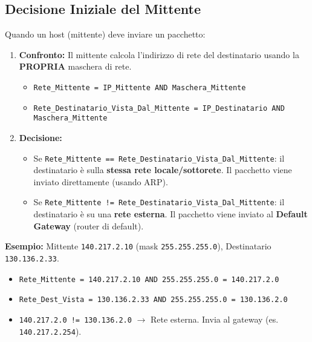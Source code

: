 \documentclass{article}
\begin{document}
\subsection{Decisione Iniziale del Mittente}
Quando un host (mittente) deve inviare un pacchetto:
\begin{enumerate}
    \item \textbf{Confronto:} Il mittente calcola l'indirizzo di rete del destinatario usando la \textbf{PROPRIA} maschera di rete.
    \begin{itemize}
        \item \texttt{Rete\_Mittente = IP\_Mittente AND Maschera\_Mittente}
        \item \texttt{Rete\_Destinatario\_Vista\_Dal\_Mittente = IP\_Destinatario AND Maschera\_Mittente}
    \end{itemize}
    \item \textbf{Decisione:}
    \begin{itemize}
        \item Se \texttt{Rete\_Mittente == Rete\_Destinatario\_Vista\_Dal\_Mittente}: il destinatario è sulla \textbf{stessa rete locale/sottorete}. Il pacchetto viene inviato direttamente (usando ARP).
        \item Se \texttt{Rete\_Mittente != Rete\_Destinatario\_Vista\_Dal\_Mittente}: il destinatario è su una \textbf{rete esterna}. Il pacchetto viene inviato al \textbf{Default Gateway} (router di default).
    \end{itemize}
\end{enumerate}
\textbf{Esempio:} Mittente \texttt{140.217.2.10} (mask \texttt{255.255.255.0}), Destinatario \texttt{130.136.2.33}.
\begin{itemize}
    \item \texttt{Rete\_Mittente = 140.217.2.10 AND 255.255.255.0 = 140.217.2.0}
    \item \texttt{Rete\_Dest\_Vista = 130.136.2.33 AND 255.255.255.0 = 130.136.2.0}
    \item \texttt{140.217.2.0 != 130.136.2.0} $\rightarrow$ Rete esterna. Invia al gateway (es. \texttt{140.217.2.254}).
\end{itemize}
\end{document}
